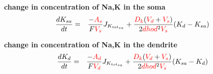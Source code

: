 \documentclass[fleqn]{report}
\numberwithin{equation}{section}
\numberwithin{equation}{section}
\begin{document}
\textbf{change in concentration of Na,K in the soma}
\begin{eqnarray}
  \frac{d K_{sa}}{dt}   &=&    \frac{-\textcolor{red}{A_{s}}}{F \textcolor{red}{V_{s}}}  J_{K_{tot_{sa}}} +  \frac{\textcolor{red}{D_{k}} (\textcolor{red}{V_{d}} + \textcolor{red}{V_{s}})}{2 \textcolor{red}{dhod}^2 \textcolor{red}{V_{s}}} (K_{d} - K_{sa})\\  
\end{eqnarray}


\textbf{change in concentration of Na,K in the dendrite}
\begin{eqnarray}
  \frac{d K_{d}}{dt}   &=&    \frac{-\textcolor{red}{A_{d}}}{F \textcolor{red}{V_{d}}}  J_{K_{tot_{sa}}} +  \frac{\textcolor{red}{D_{k}} (\textcolor{red}{V_{d}} + \textcolor{red}{V_{s}})}{2 \textcolor{red}{dhod}^2 \textcolor{red}{V_{s}}} (K_{sa} - K_{d})\\ 
\end{eqnarray}

%
%
%           

            
\end{document}

